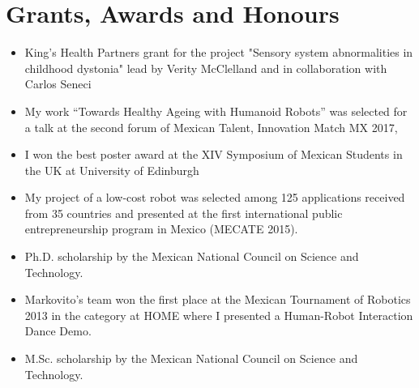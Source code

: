 \documentclass{mycv}
\begin{document}
\section{Grants, Awards and Honours}
\begin{itemize}
\item King's Health Partners grant for the project "Sensory system abnormalities in childhood dystonia" lead by Verity McClelland and in collaboration with Carlos Seneci \href{https://kclpure.kcl.ac.uk/portal/en/persons/miguel-angel-perez-xochicale(cca72683-31b7-496a-8aeb-181fd9d6a8f3)/projects.html}{\faExternalLink} 

\item My work ``Towards Healthy Ageing with Humanoid Robots'' was selected for a talk at the second forum of Mexican Talent, Innovation Match MX 2017, \href{https://github.com/mxochicale/InnovationMatchMX/tree/master/2017}{\faExternalLink} \href{https://github.com/mxochicale/InnovationMatchMX/blob/master/2017/presentation/IMMX-MA-0058.pdf}{\faFilePdfO} \href{https://www.youtube.com/watch?v=wNWzpdXdm5U}{\faYoutube} 

\item I won the best poster award at the XIV Symposium of Mexican Students in the UK at University of Edinburgh \href{https://github.com/mxochicale/symposiummx/tree/master/2016}{\faExternalLink}  

\item My project of a low-cost robot was selected among 125 applications received from 35 countries and presented at the first international public entrepreneurship program in Mexico (MECATE 2015). \href{http://let-emprendimientopublico.mx/en/portfolio_category/mecate-primera-generacion-en/}{\faExternalLink} \href{https://www.youtube.com/watch?v=VjVGnwD422g}{\faYoutube} 

\item Ph.D. scholarship by the Mexican National Council on Science and Technology. 

\item Markovito's team  won the first place at the Mexican Tournament of Robotics 2013 in the category at HOME where I presented a Human-Robot Interaction Dance Demo. \href{https://www.youtube.com/watch?v=Kw-lZam_qZI}{\faYoutube} 

\item M.Sc. scholarship by the Mexican National Council on Science and Technology. 
\end{itemize}
\end{document}
